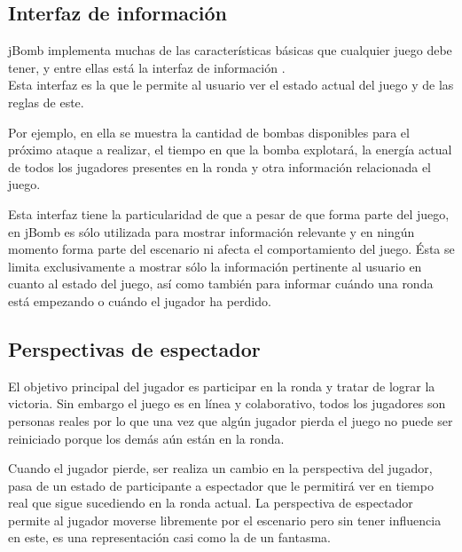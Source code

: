\documentclass[a4paper,12pt,openany,oneside]{book}
\begin{document}
\subsection{Interfaz de información}
jBomb implementa muchas de las características básicas que cualquier juego debe tener, y entre ellas está la interfaz de información \cite{BEGINNERS}.\\
Esta interfaz es la que le permite al usuario ver el estado actual del juego y de las reglas de este.

Por ejemplo, en ella se muestra la cantidad de bombas disponibles para el próximo ataque a realizar, el tiempo en que la bomba explotará, la energía actual de todos los jugadores presentes en la ronda y otra información relacionada el juego.

Esta interfaz tiene la particularidad de que a pesar de que forma parte del juego, en jBomb es sólo utilizada para mostrar información relevante y en ningún momento forma parte del escenario ni afecta el comportamiento del juego. Ésta se limita exclusivamente a mostrar sólo la información pertinente al usuario en cuanto al estado del juego, así como también para informar cuándo una ronda está empezando o cuándo el jugador ha perdido.
\subsection{Perspectivas de espectador}
El objetivo principal del jugador es participar en la ronda y tratar de lograr la victoria. Sin embargo el juego es en línea y colaborativo, todos los jugadores son personas reales por lo que una vez que algún jugador pierda el juego no puede ser reiniciado porque los demás aún están en la ronda.

Cuando el jugador pierde, ser realiza un cambio en la perspectiva del jugador, pasa de un estado de participante a espectador que le permitirá ver en tiempo real que sigue sucediendo en la ronda actual. La perspectiva de espectador permite al jugador moverse libremente por el escenario pero sin tener influencia en este, es una representación casi como la de un fantasma.
\end{document}
